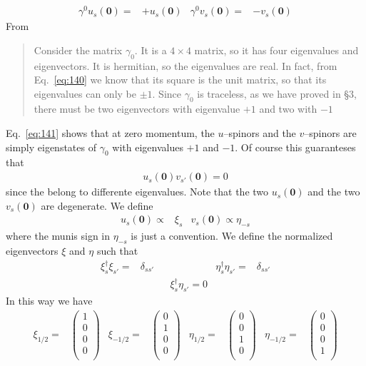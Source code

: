\begin{align}
\label{eq:141}
\gamma^0u_s(\mathbf{0})=&+u_s(\mathbf{0})&    \gamma^0v_s(\mathbf{0})=&-v_s(\mathbf{0})
\end{align}
From \cite{physics/0703214}
\begin{quote}
  Consider the matrix $\gamma_0$. It is a $4\times4$ matrix, so it has four eigenvalues and eigenvectors. It is hermitian, so the eigenvalues are real. In fact, from Eq.~\eqref{eq:140} we know that its square is the unit matrix, so that its eigenvalues can only be $\pm1$. Since $\gamma_0$ is traceless, as we have proved in \S3, there must be two eigenvectors with eigenvalue $+1$ and two with $-1$
\end{quote}
Eq.~\eqref{eq:141} shows that at zero momentum, the $u$--spinors and the $v$--spinors are simply eigenstates of $\gamma_0$ with eigenvalues $+1$ and $-1$.  Of course this guaranteses that
\begin{align}
  u_s(\mathbf{0})v_{s'}(\mathbf{0})=0
\end{align}
since the belong to differente eigenvalues. Note that the two $u_s(\mathbf{0})$ and the two $v_s(\mathbf{0})$ are degenerate. We define
\begin{align}
  \label{eq:145}
  u_s(\mathbf{0})\propto&\xi_s & v_s(\mathbf{0})\propto\eta_{-s}
\end{align}
where the munis sign in $\eta_{-s}$ is just a convention. We define the normalized eigenvectors $\xi$ and $\eta$ such that
\begin{align}
  \xi_s^\dagger\xi_{s'}=&\delta_{s s'}&&&\eta^\dagger_s\eta_{s'}=&\delta_{s s'}\nonumber\\
&&&\xi_s^\dagger\eta_{s'}=0&&
\end{align}
In this way we have
\begin{align}
  \xi_{1/2}=&\begin{pmatrix}
    1\\
    0\\
    0\\
    0\\
  \end{pmatrix}&
  \xi_{-1/2}=&\begin{pmatrix}
    0\\
    1\\
    0\\
    0\\
  \end{pmatrix} & 
\eta_{1/2}=&\begin{pmatrix}
    0\\
    0\\
    1\\
    0\\
  \end{pmatrix}&
  \eta_{-1/2}=&\begin{pmatrix}
    0\\
    0\\
    0\\
    1\\
  \end{pmatrix}
\end{align}

